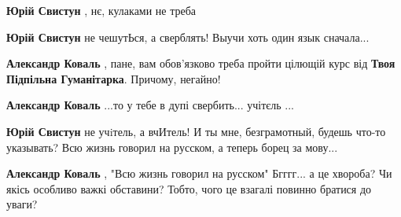 \begin{itemize}
\begin{itemize}
\textbf{Юрій Свистун} , нє, кулаками не треба

 
\textbf{Юрій Свистун} не чешутЬся, а сверблять! Выучи хоть один язык сначала...

 
\textbf{Александр Коваль} , пане, вам обов'язково треба пройти цілющій курс від \textbf{Твоя Підпільна Гуманітарка}. Причому, негайно!

 
\textbf{Александр Коваль} ...то у тебе в дупі свербить... учітєль ...

 
\textbf{Юрій Свистун} не учiтель, а вчИтель! И ты мне, безграмотный, будешь
что-то указывать? Всю жизнь говорил на русском, а теперь борец за мову...

 
\textbf{Александр Коваль} , "Всю жизнь говорил на русском" Бгггг... а це
хвороба? Чи якісь особливо важкі обставини? Тобто, чого це взагалі повинно
братися до уваги?

 

\end{itemize}
\end{itemize}

